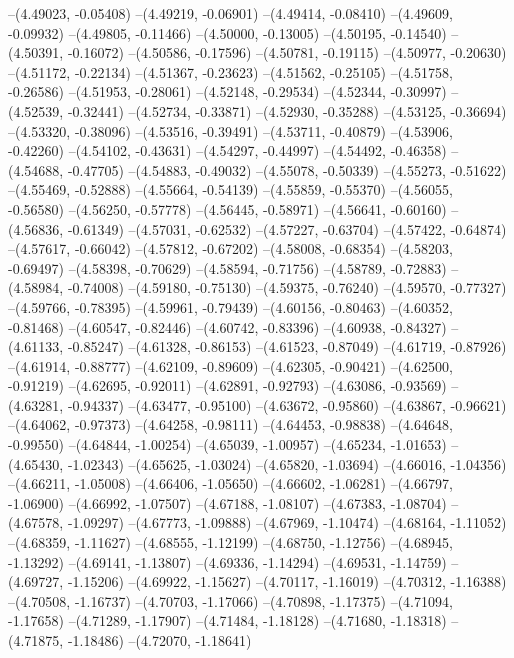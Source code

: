 --(4.49023, -0.05408)
--(4.49219, -0.06901)
--(4.49414, -0.08410)
--(4.49609, -0.09932)
--(4.49805, -0.11466)
--(4.50000, -0.13005)
--(4.50195, -0.14540)
--(4.50391, -0.16072)
--(4.50586, -0.17596)
--(4.50781, -0.19115)
--(4.50977, -0.20630)
--(4.51172, -0.22134)
--(4.51367, -0.23623)
--(4.51562, -0.25105)
--(4.51758, -0.26586)
--(4.51953, -0.28061)
--(4.52148, -0.29534)
--(4.52344, -0.30997)
--(4.52539, -0.32441)
--(4.52734, -0.33871)
--(4.52930, -0.35288)
--(4.53125, -0.36694)
--(4.53320, -0.38096)
--(4.53516, -0.39491)
--(4.53711, -0.40879)
--(4.53906, -0.42260)
--(4.54102, -0.43631)
--(4.54297, -0.44997)
--(4.54492, -0.46358)
--(4.54688, -0.47705)
--(4.54883, -0.49032)
--(4.55078, -0.50339)
--(4.55273, -0.51622)
--(4.55469, -0.52888)
--(4.55664, -0.54139)
--(4.55859, -0.55370)
--(4.56055, -0.56580)
--(4.56250, -0.57778)
--(4.56445, -0.58971)
--(4.56641, -0.60160)
--(4.56836, -0.61349)
--(4.57031, -0.62532)
--(4.57227, -0.63704)
--(4.57422, -0.64874)
--(4.57617, -0.66042)
--(4.57812, -0.67202)
--(4.58008, -0.68354)
--(4.58203, -0.69497)
--(4.58398, -0.70629)
--(4.58594, -0.71756)
--(4.58789, -0.72883)
--(4.58984, -0.74008)
--(4.59180, -0.75130)
--(4.59375, -0.76240)
--(4.59570, -0.77327)
--(4.59766, -0.78395)
--(4.59961, -0.79439)
--(4.60156, -0.80463)
--(4.60352, -0.81468)
--(4.60547, -0.82446)
--(4.60742, -0.83396)
--(4.60938, -0.84327)
--(4.61133, -0.85247)
--(4.61328, -0.86153)
--(4.61523, -0.87049)
--(4.61719, -0.87926)
--(4.61914, -0.88777)
--(4.62109, -0.89609)
--(4.62305, -0.90421)
--(4.62500, -0.91219)
--(4.62695, -0.92011)
--(4.62891, -0.92793)
--(4.63086, -0.93569)
--(4.63281, -0.94337)
--(4.63477, -0.95100)
--(4.63672, -0.95860)
--(4.63867, -0.96621)
--(4.64062, -0.97373)
--(4.64258, -0.98111)
--(4.64453, -0.98838)
--(4.64648, -0.99550)
--(4.64844, -1.00254)
--(4.65039, -1.00957)
--(4.65234, -1.01653)
--(4.65430, -1.02343)
--(4.65625, -1.03024)
--(4.65820, -1.03694)
--(4.66016, -1.04356)
--(4.66211, -1.05008)
--(4.66406, -1.05650)
--(4.66602, -1.06281)
--(4.66797, -1.06900)
--(4.66992, -1.07507)
--(4.67188, -1.08107)
--(4.67383, -1.08704)
--(4.67578, -1.09297)
--(4.67773, -1.09888)
--(4.67969, -1.10474)
--(4.68164, -1.11052)
--(4.68359, -1.11627)
--(4.68555, -1.12199)
--(4.68750, -1.12756)
--(4.68945, -1.13292)
--(4.69141, -1.13807)
--(4.69336, -1.14294)
--(4.69531, -1.14759)
--(4.69727, -1.15206)
--(4.69922, -1.15627)
--(4.70117, -1.16019)
--(4.70312, -1.16388)
--(4.70508, -1.16737)
--(4.70703, -1.17066)
--(4.70898, -1.17375)
--(4.71094, -1.17658)
--(4.71289, -1.17907)
--(4.71484, -1.18128)
--(4.71680, -1.18318)
--(4.71875, -1.18486)
--(4.72070, -1.18641)
